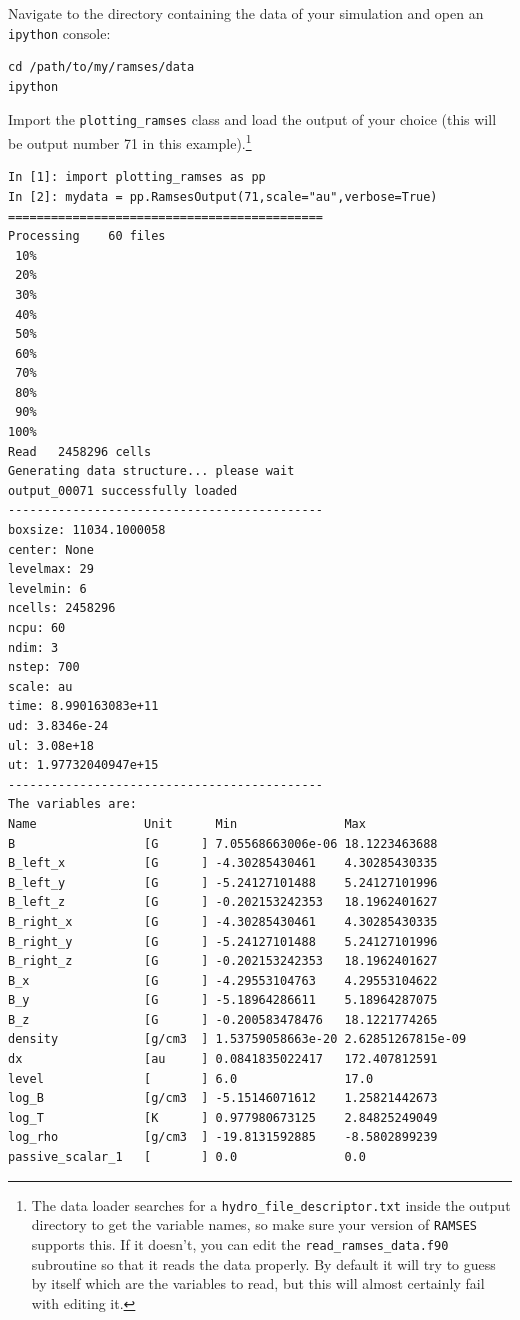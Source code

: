 \documentclass[12pt]{article}
\begin{document}
Navigate to the directory containing the data of your simulation and open an \texttt{ipython} console:
\begin{lstlisting}
cd /path/to/my/ramses/data
ipython
\end{lstlisting}
Import the \texttt{plotting\_ramses} class and load the output of your choice (this will be output number 71 in this example).\footnote{The data loader searches for a \texttt{hydro\_file\_descriptor.txt} inside the output directory to get the variable names, so make sure your version of \texttt{RAMSES} supports this. If it doesn't, you can edit the \texttt{read\_ramses\_data.f90} subroutine so that it reads the data properly. By default it will try to guess by itself which are the variables to read, but this will almost certainly fail with editing it.}
\begin{lstlisting}
In [1]: import plotting_ramses as pp
In [2]: mydata = pp.RamsesOutput(71,scale="au",verbose=True)
============================================
Processing    60 files
 10%
 20%
 30%
 40%
 50%
 60%
 70%
 80%
 90%
100%
Read   2458296 cells
Generating data structure... please wait
output_00071 successfully loaded
--------------------------------------------
boxsize: 11034.1000058
center: None
levelmax: 29
levelmin: 6
ncells: 2458296
ncpu: 60
ndim: 3
nstep: 700
scale: au
time: 8.990163083e+11
ud: 3.8346e-24
ul: 3.08e+18
ut: 1.97732040947e+15
--------------------------------------------
The variables are:
Name               Unit      Min               Max          
B                  [G      ] 7.05568663006e-06 18.1223463688    
B_left_x           [G      ] -4.30285430461    4.30285430335    
B_left_y           [G      ] -5.24127101488    5.24127101996    
B_left_z           [G      ] -0.202153242353   18.1962401627    
B_right_x          [G      ] -4.30285430461    4.30285430335    
B_right_y          [G      ] -5.24127101488    5.24127101996    
B_right_z          [G      ] -0.202153242353   18.1962401627    
B_x                [G      ] -4.29553104763    4.29553104622    
B_y                [G      ] -5.18964286611    5.18964287075    
B_z                [G      ] -0.200583478476   18.1221774265    
density            [g/cm3  ] 1.53759058663e-20 2.62851267815e-09
dx                 [au     ] 0.0841835022417   172.407812591    
level              [       ] 6.0               17.0             
log_B              [g/cm3  ] -5.15146071612    1.25821442673    
log_T              [K      ] 0.977980673125    2.84825249049    
log_rho            [g/cm3  ] -19.8131592885    -8.5802899239    
passive_scalar_1   [       ] 0.0               0.0              

\end{lstlisting}
\end{document}
